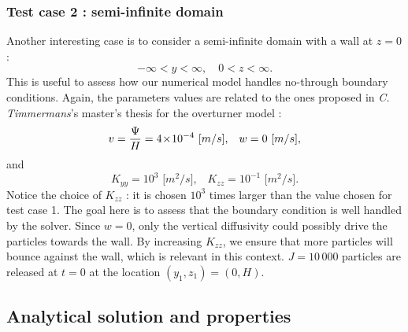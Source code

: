 \subsubsection{Test case 2 : semi-infinite domain}
Another interesting case is to consider a semi-infinite domain with a wall at $z=0$ :
\begin{equation}
	-\infty < y < \infty,\quad 0 < z < \infty.
\end{equation}
This is useful to assess how our numerical model handles no-through boundary conditions. Again, the parameters values are related to the ones proposed in \textit{C. Timmermans}'s master's thesis for the overturner model :
\begin{equation}
	v = \frac{\Psi}{H} = 4\!\times\!10^{-4}\mbox{ [$m/s$],}\quad  w = 0\mbox{ [$m/s$],}
\end{equation}
and
\begin{equation}
	K_{yy} = 10^{3} \mbox{ [$m^2/s$],}\quad K_{zz} = 10^{-1} \mbox{ [$m^2/s$].} 
\end{equation}
Notice the choice  of $K_{zz}$ : it is chosen $10^3$ times larger than the value chosen for test case 1. The goal here is to assess that the boundary condition is well handled by the solver. Since $w=0$, only the vertical diffusivity could possibly drive the particles towards the wall. By increasing $K_{zz}$, we ensure that more particles will bounce against the wall, which is relevant in this context. $J = 10\,000$ particles are released at $t=0$ at the location $(y_1,z_1) = (0,H)$.

\subsection{Analytical solution and properties}
